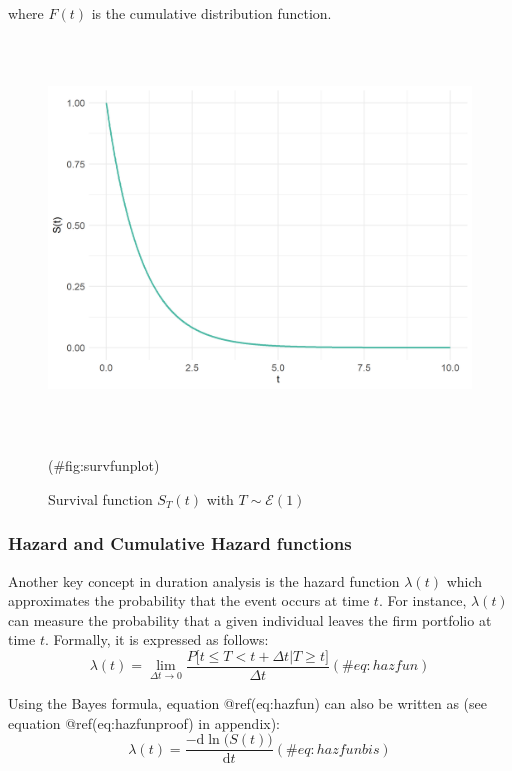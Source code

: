 \documentclass[
]{book}
\begin{document}
where \(F(t)\) is the cumulative distribution function.

\begin{figure}

{\centering \includegraphics[width=400pt,height=300pt]{./imgs/surv_fun_plot} 

}

\caption{Survival function $S_T(t)$ with $T \sim \mathcal{E} (1)$}(\#fig:survfunplot)
\end{figure}

\hypertarget{hazard-and-cumulative-hazard-functions}{%
\subsubsection*{Hazard and Cumulative Hazard functions}\label{hazard-and-cumulative-hazard-functions}}

Another key concept in duration analysis is the hazard function \(\lambda(t)\) which approximates the probability that the event occurs at time \(t\). For instance, \(\lambda(t)\) can measure the probability that a given individual leaves the firm portfolio at time \(t\). Formally, it is expressed as follows:
\begin{equation}
  \lambda(t) = \lim_{\Delta t \to 0} \frac{P\big[t \leq T < t + \Delta t | T \geq t \big]}{\Delta t}
  (\#eq:hazfun)
\end{equation}

Using the Bayes formula, equation @ref(eq:hazfun) can also be written as (see equation @ref(eq:hazfunproof) in appendix):
\begin{equation}
  \lambda(t) = \frac{-\text{d} \ln \big(S(t)\big)}{\text{d} t}
  (\#eq:hazfunbis)
\end{equation}
\end{document}
